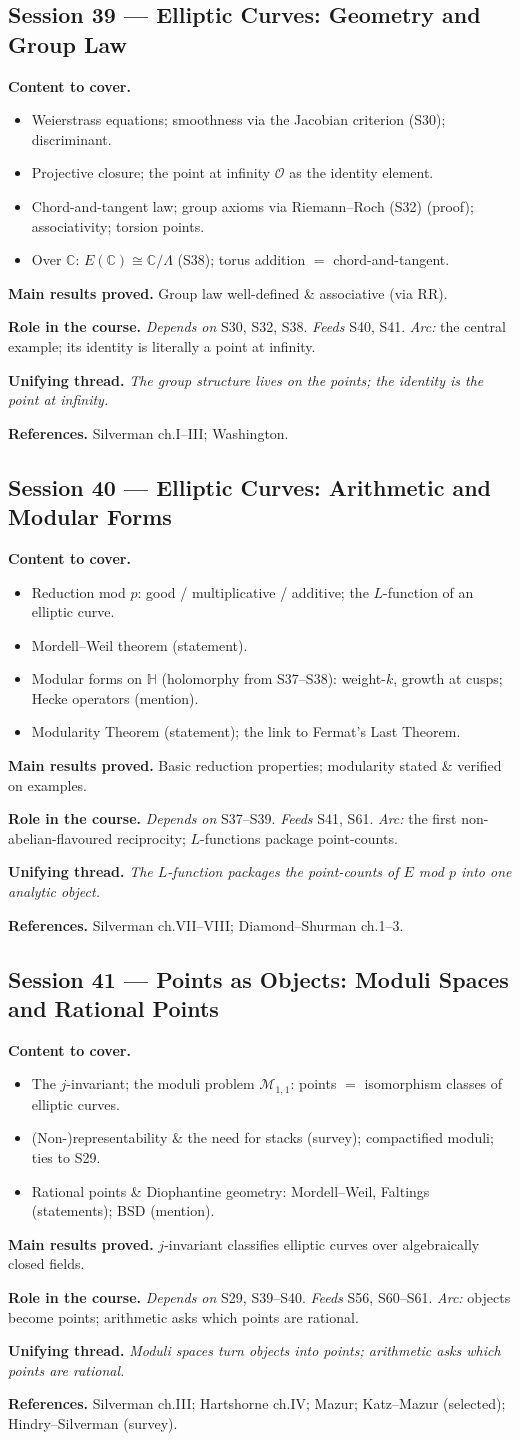 \documentclass[11pt,a4paper]{article}
\newcommand{\sess}[2]{\subsection[#1. #2]{Session #1 --- #2}}
\newcommand{\chead}{\par\smallskip\noindent\textbf{Content to cover.}}
\newcommand{\proved}[1]{\par\smallskip\noindent\textbf{Main results proved.} #1}
\newcommand{\role}[1]{\par\smallskip\noindent\textbf{Role in the course.} #1}
\newcommand{\thread}[1]{\par\smallskip\noindent\textbf{Unifying thread.} \textit{#1}}
\newcommand{\srefs}[1]{\par\smallskip\noindent\textbf{References.} #1}
\newcommand{\C}{\mathbb{C}}
\newcommand{\HH}{\mathbb{H}}
\begin{document}
	\sess{39}{Elliptic Curves: Geometry and Group Law}
	\chead
	\begin{itemize}
		\item Weierstrass equations; smoothness via the Jacobian criterion (S30); discriminant.
		\item Projective closure; the point at infinity $\mathcal O$ as the identity element.
		\item Chord-and-tangent law; group axioms via Riemann--Roch (S32) (proof); associativity; torsion points.
		\item Over $\C$: $E(\C)\cong\C/\Lambda$ (S38); torus addition $=$ chord-and-tangent.
	\end{itemize}
	\proved{Group law well-defined \& associative (via RR).}
	\role{\emph{Depends on} S30, S32, S38. \emph{Feeds} S40, S41. \emph{Arc:} the central example; its identity is literally a point at infinity.}
	\thread{The group structure lives on the points; the identity is the point at infinity.}
	\srefs{Silverman ch.I--III; Washington.}
	
	\sess{40}{Elliptic Curves: Arithmetic and Modular Forms}
	\chead
	\begin{itemize}
		\item Reduction mod $p$: good / multiplicative / additive; the $L$-function of an elliptic curve.
		\item Mordell--Weil theorem (statement).
		\item Modular forms on $\HH$ (holomorphy from S37--S38): weight-$k$, growth at cusps; Hecke operators (mention).
		\item Modularity Theorem (statement); the link to Fermat's Last Theorem.
	\end{itemize}
	\proved{Basic reduction properties; modularity stated \& verified on examples.}
	\role{\emph{Depends on} S37--S39. \emph{Feeds} S41, S61. \emph{Arc:} the first non-abelian-flavoured reciprocity; $L$-functions package point-counts.}
	\thread{The $L$-function packages the point-counts of $E$ mod $p$ into one analytic object.}
	\srefs{Silverman ch.VII--VIII; Diamond--Shurman ch.1--3.}
	
	\sess{41}{Points as Objects: Moduli Spaces and Rational Points}
	\chead
	\begin{itemize}
		\item The $j$-invariant; the moduli problem $\mathcal M_{1,1}$: points $=$ isomorphism classes of elliptic curves.
		\item (Non-)representability \& the need for stacks (survey); compactified moduli; ties to S29.
		\item Rational points \& Diophantine geometry: Mordell--Weil, Faltings (statements); BSD (mention).
	\end{itemize}
	\proved{$j$-invariant classifies elliptic curves over algebraically closed fields.}
	\role{\emph{Depends on} S29, S39--S40. \emph{Feeds} S56, S60--S61. \emph{Arc:} objects become points; arithmetic asks which points are rational.}
	\thread{Moduli spaces turn objects into points; arithmetic asks which points are rational.}
	\srefs{Silverman ch.III; Hartshorne ch.IV; Mazur; Katz--Mazur (selected); Hindry--Silverman (survey).}
	
\end{document}
